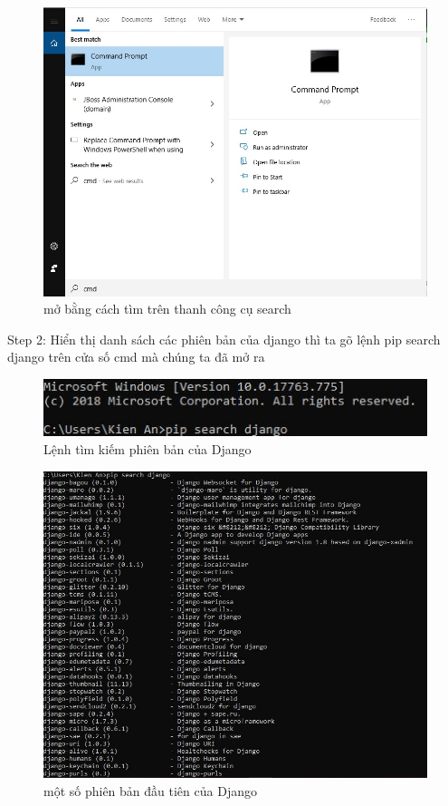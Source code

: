 \documentclass{article}
\begin{document}
\begin{figure}[htp]
        \centering
        \includegraphics[scale=0.5]{10.jpg}
        \caption{mở bằng cách tìm trên thanh công cụ search}
    \end{figure}

\pagebreak

Step 2: Hiển thị danh sách các phiên bản của django thì ta gõ lệnh 
pip search django trên cửa số cmd mà chúng ta đã mở ra

    \begin{figure}[htp]
        \centering
        \includegraphics{11.jpg}
        \caption{Lệnh tìm kiếm phiên bản của Django}
    \end{figure}
    
     \begin{figure}[htp]
        \centering
        \includegraphics[scale=0.5]{12.jpg}
        \caption{một số phiên bản đầu tiên của Django}
    \end{figure}
\end{document}
